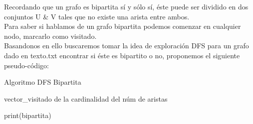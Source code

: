 \documentclass{article}
\begin{document}
Recordando que un grafo es bipartita sí y sólo sí, éste puede ser dividido en dos conjuntos U \& V tales que no existe una arista entre ambos.\\

Para saber si hablamos de un grafo bipartita podemos comenzar en cualquier nodo, marcarlo como visitado.\\

Basandonos en ello buscaremos tomar la idea de exploración DFS para un grafo dado en texto.txt encontrar si éste es bipartito o no, proponemos el siguiente pseudo-código:


\begin{center}
  \begin{minipage}{0.7\linewidth} %
    \begin{algorithm}[H] 
      \SetAlgoLined
      \DontPrintSemicolon
      \caption{Algoritmo DFS Bipartita}
      \label{alg:loop}

      
      vector\_visitado de la cardinalidad del núm de aristas\\

      print(bipartita)
      
    \end{algorithm}
  \end{minipage}
\end{center}
\end{document}

